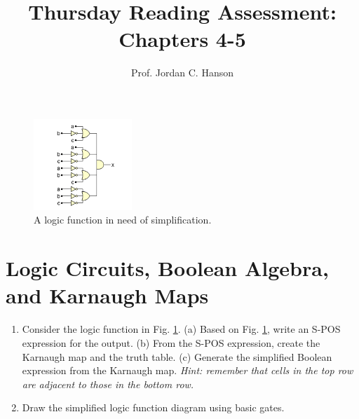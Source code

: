 \documentclass{article}
\begin{document}
\title{Thursday Reading Assessment: Chapters 4-5}
\author{Prof. Jordan C. Hanson}

\maketitle

\begin{figure}[ht]
\centering
\includegraphics[width=0.33\textwidth]{figures/SPOS_example.png}
\caption{\label{fig:1} A logic function in need of simplification.}
\end{figure}

\section{Logic Circuits, Boolean Algebra, and Karnaugh Maps}

\begin{enumerate}
\item Consider the logic function in Fig. \ref{fig:1}.  (a) Based on Fig. \ref{fig:1}, write an S-POS expression for the output. (b) From the S-POS expression, create the Karnaugh map and the truth table. (c) Generate the simplified Boolean expression from the Karnaugh map.  \textit{Hint: remember that cells in the top row are adjacent to those in the bottom row.} \\ \vspace{4cm}
\item Draw the simplified logic function diagram using basic gates.
\end{enumerate}
\end{document}
